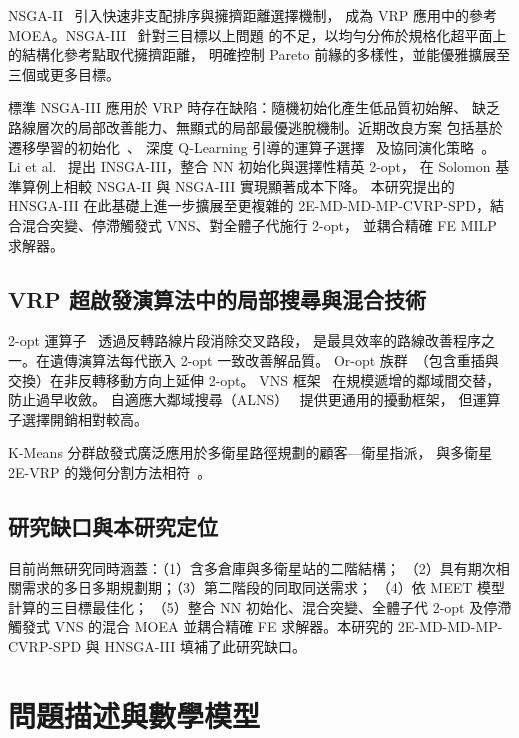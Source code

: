 \documentclass[11pt, a4paper]{article}
\numberwithin{equation}{section}
\begin{document}
NSGA-II~\cite{deb2002nsga2} 引入快速非支配排序與擁擠距離選擇機制，
成為 VRP 應用中的參考 MOEA。NSGA-III~\cite{deb2014nsga3} 針對三目標以上問題
的不足，以均勻分佈於規格化超平面上的結構化參考點取代擁擠距離，
明確控制 Pareto 前緣的多樣性，並能優雅擴展至三個或更多目標。

標準 NSGA-III 應用於 VRP 時存在缺陷：隨機初始化產生低品質初始解、
缺乏路線層次的局部改善能力、無顯式的局部最優逃脫機制。近期改良方案
包括基於遷移學習的初始化~\cite{improvedNSGA3transfer}、
深度 Q-Learning 引導的運算子選擇~\cite{dqlNSGA3} 及協同演化策略~\cite{coevNSGA3}。
Li et al.~\cite{li2025} 提出 INSGA-III，整合 NN 初始化與選擇性精英 2-opt，
在 Solomon 基準算例上相較 NSGA-II 與 NSGA-III 實現顯著成本下降。
本研究提出的 HNSGA-III 在此基礎上進一步擴展至更複雜的
2E-MD-MD-MP-CVRP-SPD，結合混合突變、停滯觸發式 VNS、對全體子代施行 2-opt，
並耦合精確 FE MILP 求解器。

\subsection{VRP 超啟發演算法中的局部搜尋與混合技術}

2-opt 運算子~\cite{lin1965} 透過反轉路線片段消除交叉路段，
是最具效率的路線改善程序之一。在遺傳演算法每代嵌入 2-opt 一致改善解品質。
Or-opt 族群~\cite{or1976}（包含重插與交換）在非反轉移動方向上延伸 2-opt。
VNS 框架~\cite{hansen2001} 在規模遞增的鄰域間交替，防止過早收斂。
自適應大鄰域搜尋（ALNS）~\cite{ropke2006} 提供更通用的擾動框架，
但運算子選擇開銷相對較高。

K-Means 分群啟發式廣泛應用於多衛星路徑規劃的顧客—衛星指派，
與多衛星 2E-VRP 的幾何分割方法相符~\cite{wang2021,wang2023}。

\subsection{研究缺口與本研究定位}

目前尚無研究同時涵蓋：（1）含多倉庫與多衛星站的二階結構；
（2）具有期次相關需求的多日多期規劃期；（3）第二階段的同取同送需求；
（4）依 MEET 模型計算的三目標最佳化；
（5）整合 NN 初始化、混合突變、全體子代 2-opt 及停滯觸發式 VNS
的混合 MOEA 並耦合精確 FE 求解器。本研究的 2E-MD-MD-MP-CVRP-SPD
與 HNSGA-III 填補了此研究缺口。

\section{問題描述與數學模型}
\label{sec:model}
\end{document}
